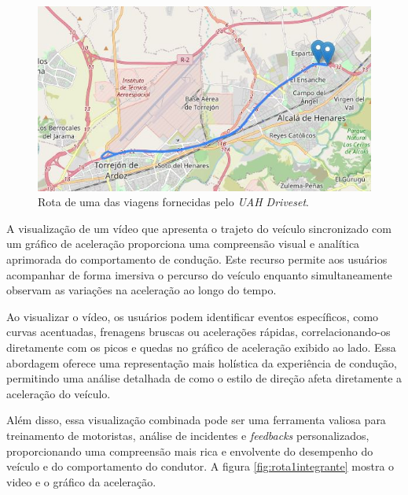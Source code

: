 \begin{figure}[hp]
    \centering
    
    \includegraphics[scale=0.8]{figures/rota_1.jpg}
    
    \caption{Rota de uma das viagens fornecidas pelo \textit{UAH Driveset}.}
    
    \label{fig:car_route_1}
\end{figure}

A visualização de um vídeo que apresenta o trajeto do veículo sincronizado com um gráfico de aceleração proporciona uma compreensão visual e analítica aprimorada do comportamento de condução. Este recurso permite aos usuários acompanhar de forma imersiva o percurso do veículo enquanto simultaneamente observam as variações na aceleração ao longo do tempo. 

Ao visualizar o vídeo, os usuários podem identificar eventos específicos, como curvas acentuadas, frenagens bruscas ou acelerações rápidas, correlacionando-os diretamente com os picos e quedas no gráfico de aceleração exibido ao lado. Essa abordagem oferece uma representação mais holística da experiência de condução, permitindo uma análise detalhada de como o estilo de direção afeta diretamente a aceleração do veículo. 

Além disso, essa visualização combinada pode ser uma ferramenta valiosa para treinamento de motoristas, análise de incidentes e \textit{feedbacks} personalizados, proporcionando uma compreensão mais rica e envolvente do desempenho do veículo e do comportamento do condutor.
A figura \ref{fig:rota1integrante} mostra o video e o gráfico da aceleração.

